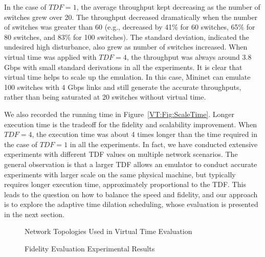 In the case of $TDF = 1$, the average throughput kept decreasing as the number of switches grew over 20.
The throughput decreased dramatically when the number of switches was greater than 60 (e.g., decreased by 41\% for 60 switches, 65\% for 80 switches, and 83\% for 100 switches).
The standard deviation, indicated the undesired high disturbance, also grew as number of switches increased.
When virtual time was applied with $TDF = 4$, the throughput was always around 3.8 Gbps with small standard derivations in all the experiments.
It is clear that virtual time helps to scale up the emulation.
In this case, Mininet can emulate 100 switches with 4 Gbps links and still generate the accurate throughputs,
rather than being saturated at 20 switches without virtual time. 

We also recorded the running time in Figure~\ref{VT:Fig:ScaleTime}.
Longer execution time is the tradeoff for the fidelity and scalability improvement.
When $TDF=4$, the execution time was about 4 times longer than the time required in the case of $TDF=1$ in all the experiments.
In fact, we have conducted extensive experiments with different TDF values on multiple network scenarios.
The general observation is that a larger TDF allows an emulator to conduct accurate experiments with larger scale on the same physical machine,
but typically requires longer execution time, approximately proportional to the TDF.
This leads to the question on how to balance the speed and fidelity,
and our approach is to explore the adaptive time dilation scheduling, whose evaluation is presented in the next section. 

\begin{figure}
\centering
\caption{Network Topologies Used in Virtual Time Evaluation}
\end{figure}

\begin{figure}
\centering
\caption{Fidelity Evaluation Experimental Results}
\end{figure}

